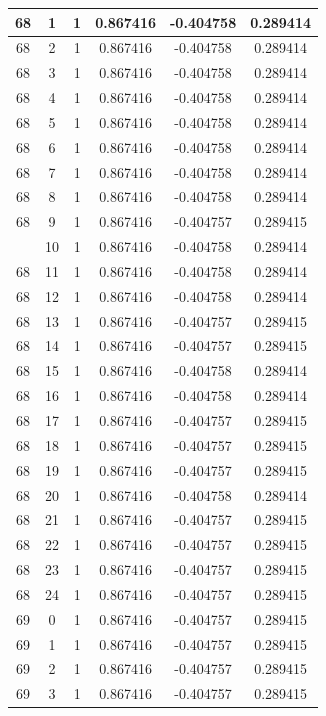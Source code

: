 \documentclass[12pt,a4paper]{article}
\numberwithin{equation}{section}
\numberwithin{figure}{section}
\numberwithin{table}{section}
\begin{document}
\begin{longtable}{|c|c|c|c|c|c|}
68 & 1 & 1 & 0.867416 & -0.404758 & 0.289414 \\ \hline
68 & 2 & 1 & 0.867416 & -0.404758 & 0.289414 \\ \hline
68 & 3 & 1 & 0.867416 & -0.404758 & 0.289414 \\ \hline
68 & 4 & 1 & 0.867416 & -0.404758 & 0.289414 \\ \hline
68 & 5 & 1 & 0.867416 & -0.404758 & 0.289414 \\ \hline
68 & 6 & 1 & 0.867416 & -0.404758 & 0.289414 \\ \hline
68 & 7 & 1 & 0.867416 & -0.404758 & 0.289414 \\ \hline
68 & 8 & 1 & 0.867416 & -0.404758 & 0.289414 \\ \hline
68 & 9 & 1 & 0.867416 & -0.404757 & 0.289415 \\ \hline
\pagebreak
68 & 10 & 1 & 0.867416 & -0.404758 & 0.289414 \\ \hline
68 & 11 & 1 & 0.867416 & -0.404758 & 0.289414 \\ \hline
68 & 12 & 1 & 0.867416 & -0.404758 & 0.289414 \\ \hline
68 & 13 & 1 & 0.867416 & -0.404757 & 0.289415 \\ \hline
68 & 14 & 1 & 0.867416 & -0.404757 & 0.289415 \\ \hline
68 & 15 & 1 & 0.867416 & -0.404758 & 0.289414 \\ \hline
68 & 16 & 1 & 0.867416 & -0.404758 & 0.289414 \\ \hline
68 & 17 & 1 & 0.867416 & -0.404757 & 0.289415 \\ \hline
68 & 18 & 1 & 0.867416 & -0.404757 & 0.289415 \\ \hline
68 & 19 & 1 & 0.867416 & -0.404757 & 0.289415 \\ \hline
68 & 20 & 1 & 0.867416 & -0.404758 & 0.289414 \\ \hline
68 & 21 & 1 & 0.867416 & -0.404757 & 0.289415 \\ \hline
68 & 22 & 1 & 0.867416 & -0.404757 & 0.289415 \\ \hline
68 & 23 & 1 & 0.867416 & -0.404757 & 0.289415 \\ \hline
68 & 24 & 1 & 0.867416 & -0.404757 & 0.289415 \\ \hline
69 & 0 & 1 & 0.867416 & -0.404757 & 0.289415 \\ \hline
69 & 1 & 1 & 0.867416 & -0.404757 & 0.289415 \\ \hline
69 & 2 & 1 & 0.867416 & -0.404757 & 0.289415 \\ \hline
69 & 3 & 1 & 0.867416 & -0.404757 & 0.289415 \\ \hline

\end{longtable}
\end{document}
